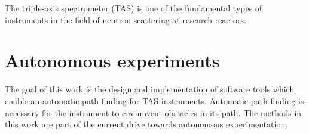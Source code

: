 The triple-axis spectrometer (TAS) is one of the fundamental types of instruments in the field of neutron scattering at research reactors.




\section{Autonomous experiments \label{sec:autonomous}}

The goal of this work is the design and implementation of software tools which enable an automatic path finding for TAS instruments.
Automatic path finding is necessary for the instrument to circumvent obstacles in its path. The methods in this work are part of the current drive towards autonomous experimentation.
